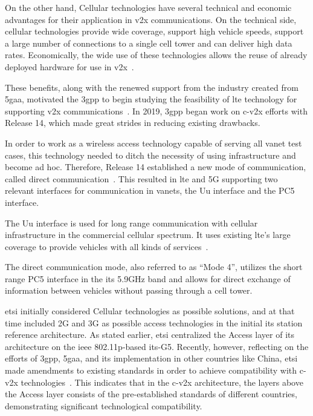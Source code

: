 On the other hand, Cellular technologies have several technical and economic advantages for their application in \gls{v2x} communications. On the technical side, cellular technologies provide wide coverage, support high vehicle speeds, support a large number of connections to a single cell tower and can deliver high data rates. Economically, the wide use of these technologies allows the reuse of already deployed hardware for use in \gls{v2x}~\cite{gyawali_challenges_2021}.

These benefits, along with the renewed support from the industry created from \gls{5gaa}, motivated the \gls{3gpp} to begin studying the feasibility of \gls{lte} technology for supporting \gls{v2x} communications~\cite{gyawali_challenges_2021}. In 2019, \gls{3gpp} began work on \gls{c-v2x} efforts with Release 14, which made great strides in reducing existing drawbacks.

In order to work as a wireless access technology capable of serving all \gls{vanet} test cases, this technology needed to ditch the necessity of using infrastructure and become ad hoc. Therefore, Release 14 established a new mode of communication, called direct communication~\cite{weber_c-v2x_2019}. This resulted in \gls{lte} and 5G supporting two relevant interfaces for communication in \glspl{vanet}, the Uu interface and the PC5 interface.

The Uu interface is used for long range communication with cellular infrastructure in the commercial cellular spectrum. It uses existing \gls{lte}'s large coverage to provide vehicles with all kinds of services~\cite{weber_c-v2x_2019}.

The direct communication mode, also referred to as “Mode 4”, utilizes the short range PC5 interface in the \gls{its} 5.9GHz band and allows for direct exchange of information between vehicles without passing through a cell tower.


\gls{etsi} initially considered Cellular technologies as possible solutions, and at that time included 2G and 3G as possible access technologies in the initial \gls{its} station reference architecture. As stated earlier, \gls{etsi} centralized the Access layer of its architecture on the \gls{ieee} 802.11p-based \gls{its}-G5. Recently, however, reflecting on the efforts of \gls{3gpp}, \gls{5gaa}, and \gls{its} implementation in other countries like China, \gls{etsi} made amendments to existing standards in order to achieve compatibility with \gls{c-v2x} technologies~\cite{weber_c-v2x_2019}. This indicates that in the \gls{c-v2x} architecture, the layers above the Access layer consists of the pre-established standards of different countries, demonstrating significant technological compatibility.


